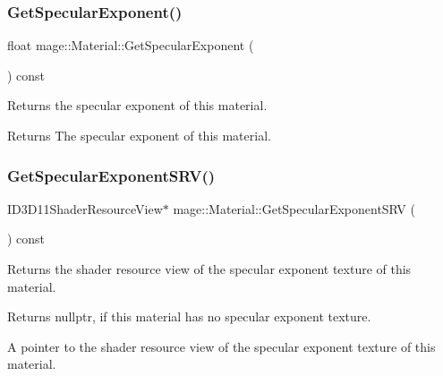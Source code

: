 \subsubsection{\texorpdfstring{Get\+Specular\+Exponent()}{GetSpecularExponent()}}
{\footnotesize\ttfamily float mage\+::\+Material\+::\+Get\+Specular\+Exponent (\begin{DoxyParamCaption}{ }\end{DoxyParamCaption}) const\hspace{0.3cm}{\ttfamily [noexcept]}}

Returns the specular exponent of this material.

\begin{DoxyReturn}{Returns}
The specular exponent of this material. 
\end{DoxyReturn}
\hypertarget{structmage_1_1_material_aca8740404b0e52c781dd1c02ec167539}{}\label{structmage_1_1_material_aca8740404b0e52c781dd1c02ec167539} 
\subsubsection{\texorpdfstring{Get\+Specular\+Exponent\+S\+R\+V()}{GetSpecularExponentSRV()}}
{\footnotesize\ttfamily I\+D3\+D11\+Shader\+Resource\+View$\ast$ mage\+::\+Material\+::\+Get\+Specular\+Exponent\+S\+RV (\begin{DoxyParamCaption}{ }\end{DoxyParamCaption}) const\hspace{0.3cm}{\ttfamily [noexcept]}}

Returns the shader resource view of the specular exponent texture of this material.

\begin{DoxyReturn}{Returns}
{\ttfamily nullptr}, if this material has no specular exponent texture. 

A pointer to the shader resource view of the specular exponent texture of this material. 
\end{DoxyReturn}
\hypertarget{structmage_1_1_material_a24c476c257c3ba042ddda666c26660c0}{}\label{structmage_1_1_material_a24c476c257c3ba042ddda666c26660c0} 

